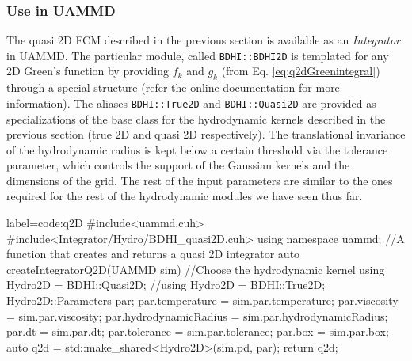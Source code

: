 \documentclass[ twoside,openright,titlepage,numbers=noenddot,%
headinclude,footinclude,cleardoublepage=empty,abstract=on,
BCOR=5mm,paper=b5,fontsize=11pt, dvipsnames
]{scrreprt}
\def\ucpp{uammd_cpp_lexer.py:UAMMDCppLexer -x}
\newcommand{\uammd}{\gls{UAMMD}\xspace}
\begin{document}
\subsubsection*{Use in UAMMD}
The quasi 2D \gls{FCM} described in the previous section is available as an \emph{Integrator} in \uammd. The particular module, called \texttt{BDHI::BDHI2D} is templated for any 2D Green's function by providing $f_k$ and $g_k$ (from Eq. \eqref{eq:q2dGreenintegral}) through a special structure (refer the online documentation for more information). The aliases \texttt{BDHI::True2D} and \texttt{BDHI::Quasi2D} are provided as specializations of the base class for the hydrodynamic kernels described in the previous section (true 2D and quasi 2D respectively).
The translational invariance of the hydrodynamic radius is kept below a certain threshold via the tolerance parameter, which controls the support of the Gaussian kernels and the dimensions of the grid.
The rest of the input parameters are similar to the ones required for the rest of the hydrodynamic modules we have seen thus far.
\begin{code2}{label=code:q2D}
#include<uammd.cuh>
#include<Integrator/Hydro/BDHI_quasi2D.cuh>
using namespace uammd;
//A function that creates and returns a quasi 2D integrator
auto createIntegratorQ2D(UAMMD sim){
  //Choose the hydrodynamic kernel
  using Hydro2D = BDHI::Quasi2D;
  //using Hydro2D = BDHI::True2D;
  Hydro2D::Parameters par;
  par.temperature = sim.par.temperature;
  par.viscosity = sim.par.viscosity;
  par.hydrodynamicRadius = sim.par.hydrodynamicRadius;
  par.dt = sim.par.dt;
  par.tolerance = sim.par.tolerance;
  par.box = sim.par.box;
  auto q2d = std::make_shared<Hydro2D>(sim.pd, par);
  return q2d;
}
\end{code2}

\newpage
\end{document}
